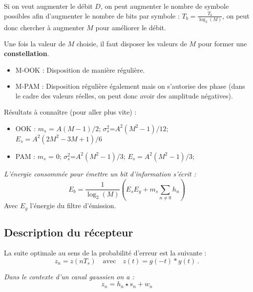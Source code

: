 	\begin{pop}
	Si on veut augmenter le débit $D$, on peut augmenter le nombre de symbole possibles afin d'augmenter le nombre de bits par symbole : $T_{b}= \frac{T_{b}}{\log_{2}(M)}$, on peut donc chercher à augmenter $M$ pour améliorer le débit.
	\end{pop}
	
	\begin{pop}
		Une fois la valeur de $M$ choisie, il faut disposer les valeurs de $M$ pour former une \textbf{constellation}.
		\begin{itemize}
		\item M-OOK : Disposition de manière régulière.
		\item M-PAM : Disposition régulière également mais on s'autorise des phase (dans le cadre des valeurs réelles, on peut donc avoir des amplitude négatives). 
		\end{itemize}
	\end{pop}

	\begin{pop}
		Résultats à connaître (pour aller plus vite) :
		\begin{itemize}
		\item OOK : $m_{s}$ = $A(M-1)/2$;     $\sigma_{s}^{2}$=$A^{2}(M^{2}-1)/12$;     $E_{s}=A^{2}(2M^{2}-3M+1)/6$
		\item PAM : $m_{s}$ = 0;    $\sigma_{s}^{2}$=$A^{2}(M^{2}-1)/3$;     $E_{s}=A^{2}(M^{2}-1)/3$;
		\end{itemize}
		\end{pop}
		\begin{pop}
		\textit{L'énergie consommée pour émettre un bit d'information s'écrit : }
		$$E_{b}=\frac{1}{\log_{2}(M)} \left( E_{s}E_{g}+m_{s} \sum_{n\neq 0} h_{n} \right)$$
		Avec $E_{g}$ l'énergie du filtre d'émission.
	\end{pop}

\subsection{Description du récepteur}

	\begin{pop}
		La suite optimale au sens de la probabilité d'erreur est la suivante :
		$$z_{n} = z(nT_{s}) \quad \text{avec} \quad z(t)=g(-t)*y(t)\ .$$
	\end{pop}
	
	\begin{pop}
	\textit{Dans le contexte d'un canal gaussien on a : }
	$$z_{n} = h_{n} \star s_{n} + w_{n}$$
	\end{pop}
	
